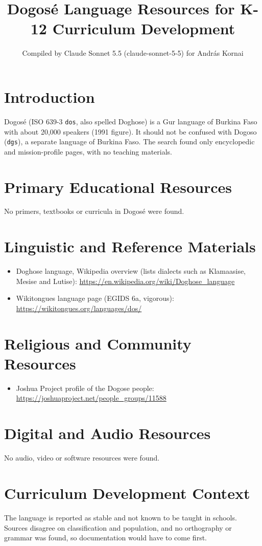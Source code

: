 \documentclass[12pt]{article}
\title{Dogos\'e Language Resources for K-12 Curriculum Development}
\author{Compiled by Claude Sonnet 5.5 (claude-sonnet-5-5) for Andr\'as Kornai}
\date{}
\begin{document}
\maketitle

\section{Introduction}
Dogos\'e (ISO 639-3 \texttt{dos}, also spelled Doghose) is a Gur language of Burkina Faso with about 20,000 speakers (1991 figure). It should not be confused with Dogoso (\texttt{dgs}), a separate language of Burkina Faso. The search found only encyclopedic and mission-profile pages, with no teaching materials.

\section{Primary Educational Resources}
No primers, textbooks or curricula in Dogos\'e were found.

\section{Linguistic and Reference Materials}
\begin{itemize}
\item Doghose language, Wikipedia overview (lists dialects such as Klamaasise, Mesise and Lutise): \url{https://en.wikipedia.org/wiki/Doghose_language}
\item Wikitongues language page (EGIDS 6a, vigorous): \url{https://wikitongues.org/languages/dos/}
\end{itemize}

\section{Religious and Community Resources}
\begin{itemize}
\item Joshua Project profile of the Dogose people: \url{https://joshuaproject.net/people_groups/11588}
\end{itemize}

\section{Digital and Audio Resources}
No audio, video or software resources were found.

\section{Curriculum Development Context}
The language is reported as stable and not known to be taught in schools. Sources disagree on classification and population, and no orthography or grammar was found, so documentation would have to come first.
\end{document}
